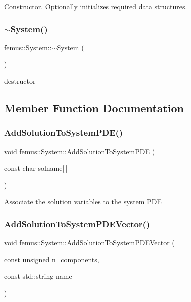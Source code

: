 Constructor. Optionally initializes required data structures. \mbox{\label{classfemus_1_1_system_a9daeda058e7ad95e42816969019e4aac}} 
\subsubsection{\texorpdfstring{$\sim$\+System()}{~System()}}
{\footnotesize\ttfamily femus\+::\+System\+::$\sim$\+System (\begin{DoxyParamCaption}{ }\end{DoxyParamCaption})\hspace{0.3cm}{\ttfamily [virtual]}}

destructor 

\subsection{Member Function Documentation}
\mbox{\label{classfemus_1_1_system_a606e07526d7a0d31eed638404ee2ed24}} 
\subsubsection{\texorpdfstring{Add\+Solution\+To\+System\+P\+D\+E()}{AddSolutionToSystemPDE()}}
{\footnotesize\ttfamily void femus\+::\+System\+::\+Add\+Solution\+To\+System\+P\+DE (\begin{DoxyParamCaption}\item[{const char}]{solname\mbox{[}$\,$\mbox{]} }\end{DoxyParamCaption})}

Associate the solution variables to the system P\+DE \mbox{\label{classfemus_1_1_system_a54c8e2e5af5b8b63ecdf7720bd93452d}} 
\subsubsection{\texorpdfstring{Add\+Solution\+To\+System\+P\+D\+E\+Vector()}{AddSolutionToSystemPDEVector()}}
{\footnotesize\ttfamily void femus\+::\+System\+::\+Add\+Solution\+To\+System\+P\+D\+E\+Vector (\begin{DoxyParamCaption}\item[{const unsigned}]{n\+\_\+components,  }\item[{const std\+::string}]{name }\end{DoxyParamCaption})}


